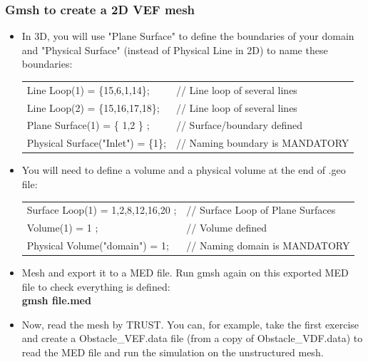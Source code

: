 \documentclass[10pt]{beamer}
\begin{document}
\begin{frame}
\frametitle{Gmsh to create a 2D VEF mesh}
\begin{block}{}

\begin{itemize}
\item In 3D, you will use "Plane Surface" to define the boundaries of your domain and "Physical Surface" (instead of Physical Line in 2D) to name these boundaries: \\
\begin{tabular}{ll}
{\small{Line Loop(1) = \{15,6,1,14\};}}         & {\small{// Line loop of several lines}}   \tabularnewline
{\small{Line Loop(2) = \{15,16,17,18\};}}       & {\small{// Line loop of several lines}}   \tabularnewline
{\small{Plane Surface(1) = \{ 1,2 \} ;}}        & {\small{// Surface/boundary defined}}     \tabularnewline
{\small{Physical Surface("Inlet") = \{1\};}}    & {\small{// Naming boundary is MANDATORY}} \tabularnewline
\end{tabular}

\item You will need to define a volume and a physical volume at the end of .geo file:
\begin{tabular}{ll}
{\small{Surface Loop(1) = { 1,2,8,12,16,20 } ;}}    & {\small{ // Surface Loop of Plane Surfaces }}     \tabularnewline
{\small{Volume(1) = { 1 } ;}}                       & {\small{ // Volume defined }}                     \tabularnewline
{\small{Physical Volume("domain") = 1;}}            & {\small{ // Naming domain is MANDATORY }}         \tabularnewline
\end{tabular}

\item Mesh and export it to a MED file. Run gmsh again on this exported MED file to check everything is defined:\\
\textbf{gmsh file.med}

\item Now, read the mesh by TRUST. You can, for example, take the first exercise and create a Obstacle\_VEF.data file (from a copy of Obstacle\_VDF.data) to read the MED file and run the simulation on the unstructured mesh.
\end{itemize}

\end{block}
\end{frame}
\end{document}

